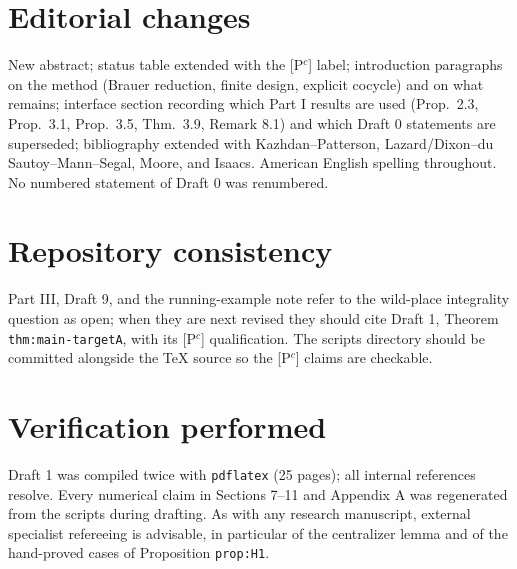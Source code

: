 \documentclass[11pt]{article}
\begin{document}
\section*{Editorial changes}
New abstract; status table extended with the [P$^c$] label; introduction
paragraphs on the method (Brauer reduction, finite design, explicit
cocycle) and on what remains; interface section recording which Part I
results are used (Prop.\ 2.3, Prop.\ 3.1, Prop.\ 3.5, Thm.\ 3.9, Remark 8.1)
and which Draft 0 statements are superseded; bibliography extended with
Kazhdan--Patterson, Lazard/Dixon--du Sautoy--Mann--Segal, Moore, and
Isaacs.  American English spelling throughout.  No numbered statement of
Draft 0 was renumbered.

\section*{Repository consistency}
Part III, Draft 9, and the running-example note refer to the wild-place
integrality question as open; when they are next revised they should cite
Draft 1, Theorem \texttt{thm:main-targetA}, with its [P$^c$] qualification.
The scripts directory should be committed alongside the TeX source so the
[P$^c$] claims are checkable.

\section*{Verification performed}
Draft 1 was compiled twice with \texttt{pdflatex} (25 pages); all internal
references resolve.  Every numerical claim in Sections 7--11 and Appendix A
was regenerated from the scripts during drafting.  As with any research
manuscript, external specialist refereeing is advisable, in particular of
the centralizer lemma and of the hand-proved cases of Proposition
\texttt{prop:H1}.
\end{document}

